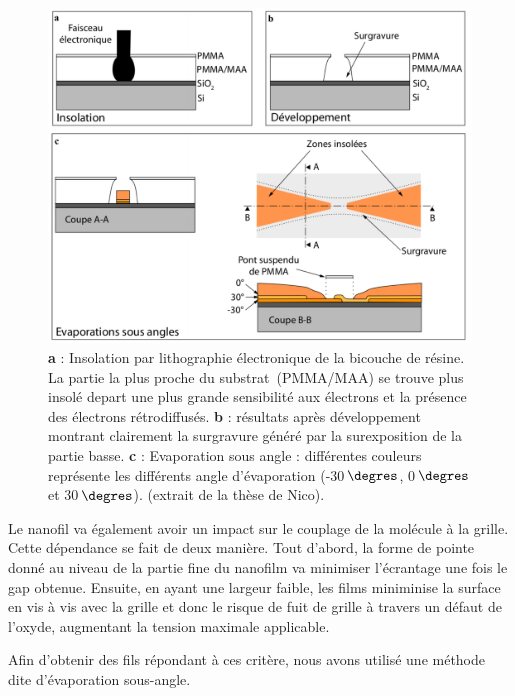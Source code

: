 \begin{figure}[h!]
\centering \includegraphics[scale=0.45]{Fabrication/EvapAngle/EvapAngle.pdf}
\caption{\textbf{a} : Insolation par lithographie électronique de la bicouche de résine. La partie la plus proche du substrat~(PMMA/MAA) se trouve plus insolé depart une plus grande sensibilité aux électrons et la présence des électrons rétrodiffusés. \textbf{b} : résultats après développement montrant clairement la surgravure généré par la surexposition de la partie basse. \textbf{c} : Evaporation sous angle : différentes couleurs représente les différents angle d'évaporation (-30$\,\degres$, 0$\,\degres$ et 30$\,\degres$). (extrait de la thèse de Nico).}
\label{EvapAngle}
\end{figure}

Le nanofil va également avoir un impact sur le couplage de la molécule à la grille. Cette dépendance se fait de deux manière. Tout d'abord, la forme de pointe donné au niveau de la partie fine du nanofilm va minimiser l'écrantage une fois le gap obtenue. Ensuite, en ayant une largeur faible, les films miniminise la surface en vis à vis avec la grille et donc le risque de fuit de grille à travers un défaut de l'oxyde, augmentant la tension maximale applicable.

Afin d'obtenir des fils répondant à ces critère, nous avons utilisé une méthode dite d'évaporation sous-angle. 

